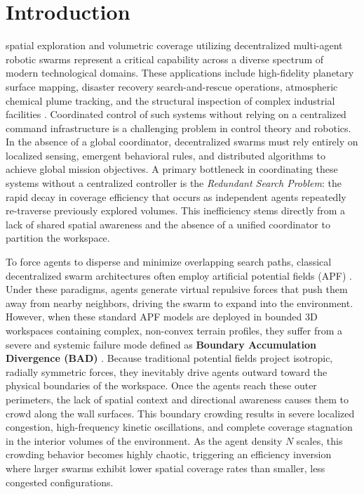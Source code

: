 \documentclass[letterpaper, 10pt, conference]{IEEEtran}
\begin{document}
\section{Introduction}
\label{sec:intro}

 spatial exploration and volumetric coverage utilizing decentralized multi-agent robotic swarms represent a critical capability across a diverse spectrum of modern technological domains. These applications include high-fidelity planetary surface mapping, disaster recovery search-and-rescue operations, atmospheric chemical plume tracking, and the structural inspection of complex industrial facilities \cite{latombe1991, brambilla2013}. Coordinated control of such systems without relying on a centralized command infrastructure is a challenging problem in control theory and robotics. In the absence of a global coordinator, decentralized swarms must rely entirely on localized sensing, emergent behavioral rules, and distributed algorithms to achieve global mission objectives. A primary bottleneck in coordinating these systems without a centralized controller is the \textit{Redundant Search Problem}: the rapid decay in coverage efficiency that occurs as independent agents repeatedly re-traverse previously explored volumes. This inefficiency stems directly from a lack of shared spatial awareness and the absence of a unified coordinator to partition the workspace.

To force agents to disperse and minimize overlapping search paths, classical decentralized swarm architectures often employ artificial potential fields (APF) \cite{saska2014cooperative}. Under these paradigms, agents generate virtual repulsive forces that push them away from nearby neighbors, driving the swarm to expand into the environment. However, when these standard APF models are deployed in bounded 3D workspaces containing complex, non-convex terrain profiles, they suffer from a severe and systemic failure mode defined as \textbf{Boundary Accumulation Divergence (BAD)} \cite{saska2014cooperative}. Because traditional potential fields project isotropic, radially symmetric forces, they inevitably drive agents outward toward the physical boundaries of the workspace. Once the agents reach these outer perimeters, the lack of spatial context and directional awareness causes them to crowd along the wall surfaces. This boundary crowding results in severe localized congestion, high-frequency kinetic oscillations, and complete coverage stagnation in the interior volumes of the environment. As the agent density $N$ scales, this crowding behavior becomes highly chaotic, triggering an efficiency inversion where larger swarms exhibit lower spatial coverage rates than smaller, less congested configurations.
\end{document}
